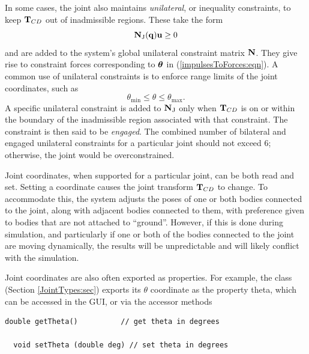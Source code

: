 In some cases, the joint also maintains {\it unilateral}, or inequality
constraints, to keep ${\bf T}_{CD}$ out of inadmissible regions. These take
the form
%
\begin{equation}
{\bf N}_\text{J}({\bf q}) {\bf u} \ge 0
\label{unilateralN:eqn}
\end{equation}
%
and are added to the system's global unilateral constraint matrix
${\bf N}$.  They give rise to constraint forces corresponding to $\boldsymbol\theta$ in
(\ref{impulsesToForces:eqn}). A common use of unilateral constraints
is to enforce range limits of the joint coordinates, such as
%
\begin{equation}
\theta_{\text{min}} \le \theta \le \theta_{\text{max}}.
\end{equation}
%
A specific unilateral constraint is added to ${\bf N}_\text{J}$ only when
${\bf T}_{CD}$ is on or within the boundary of the inadmissible region
associated with that constraint. The constraint is then said to be
{\it engaged}. The combined number of bilateral and engaged unilateral
constraints for a particular joint should not exceed 6; otherwise, the
joint would be overconstrained.

Joint coordinates, when supported for a particular joint, can be both
read and set. Setting a coordinate causes the joint transform
${\bf T}_{CD}$ to change. To accommodate this, the system adjusts the poses
of one or both bodies connected to the joint, along with adjacent
bodies connected to them, with preference given to bodies that are not
attached to ``ground''.  However, if this is done during simulation,
and particularly if one or both of the bodies connected to the joint
are moving dynamically, the results will be unpredictable and will
likely conflict with the simulation.

Joint coordinates are also often exported as properties. For example,
the
class (Section \ref{JointTypes:sec}) exports its $\theta$ coordinate
as the property {\sf theta}, which can be accessed in the GUI, or via
the accessor methods
%
\begin{lstlisting}[]
  double getTheta()          // get theta in degrees

  void setTheta (double deg) // set theta in degrees
\end{lstlisting}
%

